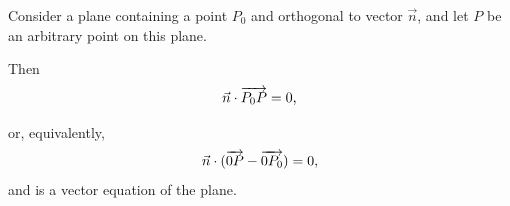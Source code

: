 \documentclass[pdf,9pt]{beamer}
\begin{document}
{%
\begin{frame}[fragile]
\begin{emptytitle}
    Consider a plane containing a point $P_0$
    and orthogonal to vector
    $\vec{n}$, and let $P$ be an arbitrary point on this plane.
\end{emptytitle}
\pause
\vfill
\begin{emptytitle}
    Then \[ \vec{n}\cdot\overrightarrow{P_0P} = 0,\]
\end{emptytitle}
\pause
\vfill
\begin{emptytitle}
    or, equivalently,
    \[ \vec{n}\cdot (\overrightarrow{0P}-\overrightarrow{0P_0}) = 0,\]
    and is a \alert{vector equation} of the plane.
\end{emptytitle}
\end{frame}
}
\end{document}

